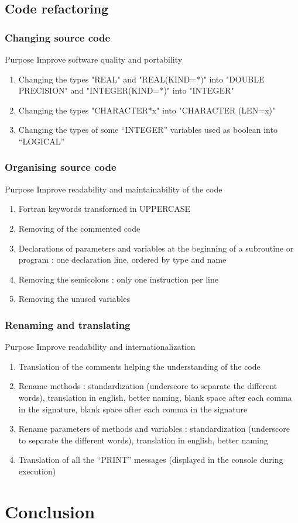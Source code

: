 \documentclass[10p]{beamer}
\begin{document}
\subsection{Code refactoring}
\begin{frame}
\frametitle{Changing source code}
\begin{block}{Purpose}
Improve software quality and portability
\end{block}
\begin{enumerate}
\item Changing the types "REAL" and "REAL(KIND=*)" into "DOUBLE PRECISION" and "INTEGER(KIND=*)" into "INTEGER"
\item Changing the types "CHARACTER*x" into "CHARACTER (LEN=x)"
\item Changing the types of some “INTEGER” variables used as boolean into “LOGICAL”
\end{enumerate}
\end{frame}
\begin{frame}
\frametitle{Organising source code}
\begin{block}{Purpose}
Improve readability and maintainability of the code
\end{block}
\begin{enumerate}
\item Fortran keywords transformed in UPPERCASE
\item Removing of the commented code
\item Declarations of parameters and variables at the beginning of a subroutine or program : one declaration line, ordered by type and name
\item Removing the semicolons : only one instruction per line
\item Removing the unused variables
\end{enumerate}
\end{frame}
\begin{frame}
\frametitle{Renaming and translating}
\begin{block}{Purpose}
Improve readability and internationalization
\end{block}
\begin{enumerate}
\item Translation of the comments helping the understanding of the code
\item Rename methods : standardization (underscore to separate the different words), translation in english, better naming, blank space after each comma in the signature, blank space after each comma in the signature
\item Rename parameters of methods and variables : standardization (underscore to separate the different words), translation in english, better naming
\item Translation of all the “PRINT” messages (displayed in the console during execution)
\end{enumerate}
\end{frame}
\section{Conclusion}
\begin{frame}
\end{frame}
\end{document}
